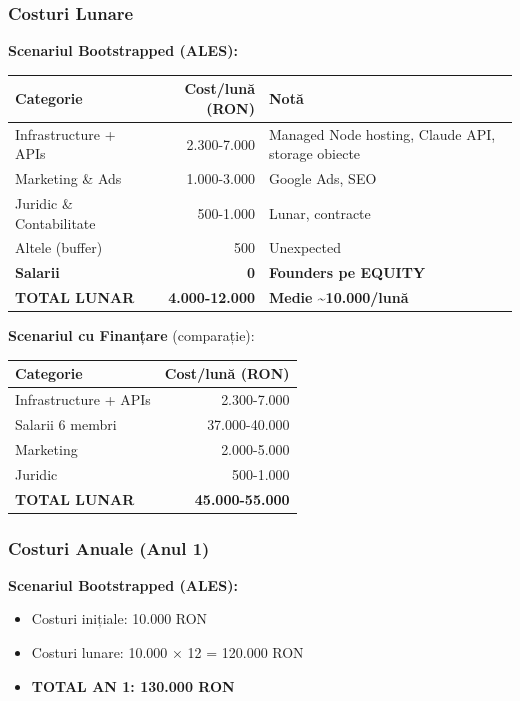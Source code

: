 \documentclass[11pt,a4paper]{article}
\begin{document}
\subsubsection{Costuri Lunare}

\textbf{Scenariul Bootstrapped (ALES):}

\begin{table}[H]
\centering
\begin{tabular}{|l|r|l|}
\hline
\rowcolor{lightgray}
\textbf{Categorie} & \textbf{Cost/lună (RON)} & \textbf{Notă} \\
\hline
Infrastructure + APIs & 2.300-7.000 & Managed Node hosting, Claude API, storage obiecte \\
Marketing \& Ads & 1.000-3.000 & Google Ads, SEO \\
Juridic \& Contabilitate & 500-1.000 & Lunar, contracte \\
Altele (buffer) & 500 & Unexpected \\
\textbf{Salarii} & \textbf{0} & \textbf{Founders pe EQUITY} \\
\hline
\rowcolor{lightgray}
\textbf{TOTAL LUNAR} & \textbf{4.000-12.000} & \textbf{Medie \textasciitilde10.000/lună} \\
\hline
\end{tabular}
\end{table}

\textbf{Scenariul cu Finanțare} (comparație):

\begin{table}[H]
\centering
\begin{tabular}{|l|r|}
\hline
\rowcolor{lightgray}
\textbf{Categorie} & \textbf{Cost/lună (RON)} \\
\hline
Infrastructure + APIs & 2.300-7.000 \\
Salarii 6 membri & 37.000-40.000 \\
Marketing & 2.000-5.000 \\
Juridic & 500-1.000 \\
\hline
\rowcolor{lightgray}
\textbf{TOTAL LUNAR} & \textbf{45.000-55.000} \\
\hline
\end{tabular}
\end{table}

\subsubsection{Costuri Anuale (Anul 1)}

\textbf{Scenariul Bootstrapped (ALES):}
\begin{itemize}[nosep]
    \item Costuri inițiale: 10.000 RON
    \item Costuri lunare: 10.000 × 12 = 120.000 RON
    \item \textbf{TOTAL AN 1: 130.000 RON}
\end{itemize}
\end{document}
